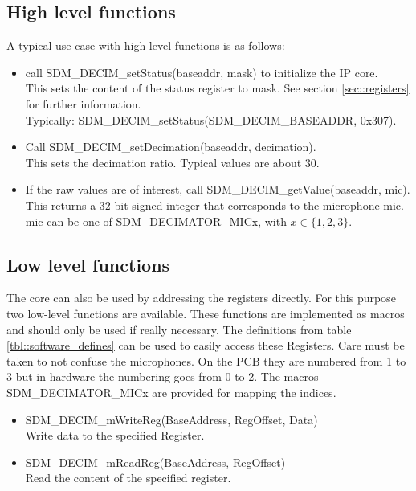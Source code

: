 \subsection{High level functions}
A typical use case with high level functions is as follows:
\begin{itemize}
	\item call SDM\_DECIM\_setStatus(baseaddr, mask) to initialize the IP core. \\
		This sets the content of the status register to mask. See section \ref{sec::registers} for further information.\\
		Typically: SDM\_DECIM\_setStatus(SDM\_DECIM\_BASEADDR, 0x307).
	\item Call SDM\_DECIM\_setDecimation(baseaddr, decimation). \\
		This sets the decimation ratio. Typical values are about 30.
	\item If the raw values are of interest, call SDM\_DECIM\_getValue(baseaddr, mic).\\
		This returns a 32 bit signed integer that corresponds to the microphone mic. \\
		mic can be one of SDM\_DECIMATOR\_MICx, with $x\in\{1,2,3\}$.
\end{itemize}

\subsection{Low level functions}
The core can also be used by addressing the registers directly.
For this purpose two low-level functions are available.
These functions are implemented as macros and should only be used if really necessary.
The definitions from table \ref{tbl::software_defines} can be used to easily access these Registers.
Care must be taken to not confuse the microphones. 
On the PCB they are numbered from 1 to 3 but in hardware the numbering goes from 0 to 2.
The macros SDM\_DECIMATOR\_MICx are provided for mapping the indices.

\begin{itemize}
	\item SDM\_DECIM\_mWriteReg(BaseAddress, RegOffset, Data) \\
		Write data to the specified Register. 
	\item SDM\_DECIM\_mReadReg(BaseAddress, RegOffset) \\		
		Read the content of the specified register.
\end{itemize}

